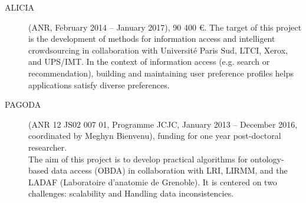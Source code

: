 \begin{description}
\item[ALICIA] (ANR, February 2014 -- January 2017), 90 400 \euro. The target of this project is the development of methods for information access and intelligent crowdsourcing in collaboration with Universit{\'e} Paris Sud, LTCI, Xerox, and UPS/IMT. In the context of information access (e.g. search or recommendation), building and maintaining user preference profiles helps applications satisfy diverse preferences. 

\item[PAGODA] (ANR 12 JS02 007 01, Programme JCJC, January 2013 -- December 2016, coordinated by Meghyn Bienvenu), funding for one year post-doctoral researcher. \\
The aim of this project is to develop practical algorithms for ontology-based data access (OBDA) in collaboration with LRI, LIRMM, and the LADAF (Laboratoire d'anatomie de Grenoble). It is centered on two challenges: scalability and Handling data inconsistencies. 


\end{description}
